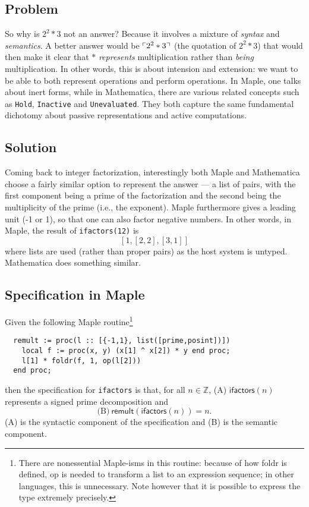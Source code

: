 \documentclass[fleqn]{llncs}
\begin{document}
\subsection{Problem}

So why is $2^2 * 3$ not an answer? Because it involves a mixture of
\emph{syntax} and \emph{semantics}. A better answer would be
$\ulcorner2^2 * 3\urcorner$ (the quotation of $2^2 * 3$) that would
then make it clear that $*$ \emph{represents} multiplication
rather than \emph{being} multiplication. In other words, this is about
intension and extension: we want to be able to both represent
operations and perform operations. In Maple, one talks about
\textsf{inert forms}, while in Mathematica, there are various related
concepts such as \texttt{Hold}, \texttt{Inactive} and
\texttt{Unevaluated}.  They both capture the same fundamental
dichotomy about passive representations and active computations.

\subsection{Solution}

Coming back to integer factorization, interestingly both Maple and
Mathematica choose a fairly similar option to represent the answer ---
a list of pairs, with the first component being a prime of the
factorization and the second being the multiplicity of the
prime (i.e., the exponent).  Maple furthermore gives a leading unit
(-1 or 1), so that one can also factor negative numbers. In other
words, in Maple, the result of \texttt{ifactors(12)} is
\[ \left[ 1, \left[2,2\right], \left[3,1\right]\right] \]
where lists are used (rather than proper pairs) as the host system is
untyped.  Mathematica does something similar.

\subsection{Specification in Maple}

Given the following Maple routine\footnote{There are nonessential
  Maple-isms in this routine: because of how \textsf{foldr} is
  defined, \textsf{op} is needed to transform a list to an expression
  sequence; in other languages, this is unnecessary.  Note however
  that it is possible to express the type extremely precisely.}
\begin{verbatim}
  remult := proc(l :: [{-1,1}, list([prime,posint])]) 
    local f := proc(x, y) (x[1] ^ x[2]) * y end proc;
    l[1] * foldr(f, 1, op(l[2]))
  end proc; 
\end{verbatim}
\noindent then the specification for \texttt{ifactors} is that, for
all $n\in \mathbb{Z}$, (A) $\mathsf{ifactors}(n)$ represents a signed
prime decomposition and 
\[ \text{(B)}~\mathsf{remult}\left(\mathsf{ifactors}\left(n\right)\right) = n. \]
(A) is the syntactic component of the specification and (B) is the
semantic component.
\end{document}
